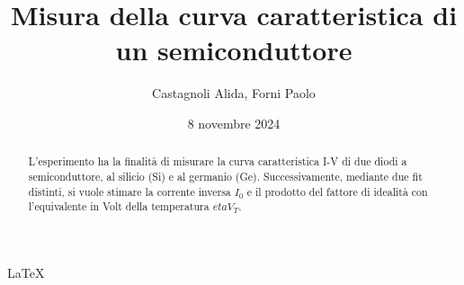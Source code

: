\documentclass[11pt]{article}
\begin{document}
\LaTeX

\title{\textbf{Misura della curva caratteristica di un semiconduttore}}
\author{Castagnoli Alida, Forni Paolo}
\date{8 novembre 2024}
\maketitle

\begin{abstract}
    L'esperimento ha la finalità di misurare la curva caratteristica I-V di due diodi a semiconduttore, al silicio (Si) e al germanio (Ge). Successivamente, mediante due fit distinti, si vuole stimare la corrente inversa $I_{0}$ e il prodotto del fattore di idealità con l'equivalente in Volt della temperatura $eta V_{T}$.  
\end{abstract}


\end{document}
